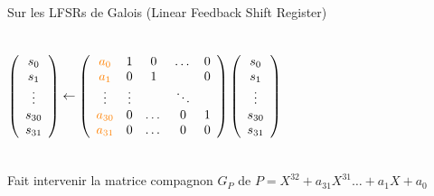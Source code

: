 \begin{frame}{Sur les LFSRs de Galois (Linear Feedback Shift Register)}
\begin{columns}[c]
\[\left(\begin{array}{c}
        s_0 \\
        s_1 \\
        \vdots \\
        s_{30}\\
        s_{31}\\
    \end{array}\right)
    \leftarrow
    \left(
    \begin{array}{c c c c c }
        \textcolor{orange}{a_0} & 1 & 0 & \dots & 0\\
        \textcolor{orange}{a_1} & 0 & 1 & &0\\
        \vdots& \vdots & & \ddots &  \\
        \textcolor{orange}{a_{30}} & 0 & \dots &0 & 1\\
        \textcolor{orange}{a_{31}} & 0 & \dots &0 & 0\\
    \end{array}
\right)\left(\begin{array}{c}
        s_0 \\
        s_1 \\
        \vdots \\
        s_{30} \\
        s_{31}\\
    \end{array}\right)\]
    \end{columns}

    \pause 
    
    \begin{outline}
        \1 Fait intervenir la matrice compagnon $G_P$ de $P = X^{32} + a_{31}X^{31} \dots +a_1 X +a_0$
    \end{outline}
\end{frame}

